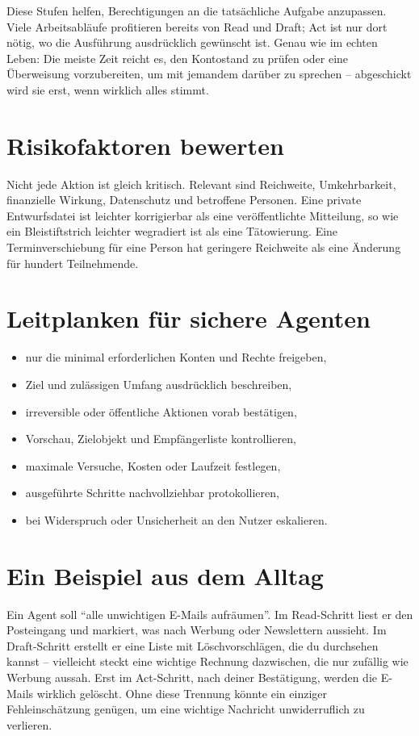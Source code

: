 Diese Stufen helfen, Berechtigungen an die tatsächliche Aufgabe anzupassen. Viele Arbeitsabläufe profitieren bereits von Read und Draft; Act ist nur dort nötig, wo die Ausführung ausdrücklich gewünscht ist. Genau wie im echten Leben: Die meiste Zeit reicht es, den Kontostand zu prüfen oder eine Überweisung vorzubereiten, um mit jemandem darüber zu sprechen -- abgeschickt wird sie erst, wenn wirklich alles stimmt.

\section{Risikofaktoren bewerten}

Nicht jede Aktion ist gleich kritisch. Relevant sind Reichweite, Umkehrbarkeit, finanzielle Wirkung, Datenschutz und betroffene Personen. Eine private Entwurfsdatei ist leichter korrigierbar als eine veröffentlichte Mitteilung, so wie ein Bleistiftstrich leichter wegradiert ist als eine Tätowierung. Eine Terminverschiebung für eine Person hat geringere Reichweite als eine Änderung für hundert Teilnehmende.

\section{Leitplanken für sichere Agenten}

\begin{itemize}
\item nur die minimal erforderlichen Konten und Rechte freigeben,
\item Ziel und zulässigen Umfang ausdrücklich beschreiben,
\item irreversible oder öffentliche Aktionen vorab bestätigen,
\item Vorschau, Zielobjekt und Empfängerliste kontrollieren,
\item maximale Versuche, Kosten oder Laufzeit festlegen,
\item ausgeführte Schritte nachvollziehbar protokollieren,
\item bei Widerspruch oder Unsicherheit an den Nutzer eskalieren.
\end{itemize}

\section{Ein Beispiel aus dem Alltag}

Ein Agent soll ``alle unwichtigen E-Mails aufräumen''. Im Read-Schritt liest er den Posteingang und markiert, was nach Werbung oder Newslettern aussieht. Im Draft-Schritt erstellt er eine Liste mit Löschvorschlägen, die du durchsehen kannst -- vielleicht steckt eine wichtige Rechnung dazwischen, die nur zufällig wie Werbung aussah. Erst im Act-Schritt, nach deiner Bestätigung, werden die E-Mails wirklich gelöscht. Ohne diese Trennung könnte ein einziger Fehleinschätzung genügen, um eine wichtige Nachricht unwiderruflich zu verlieren.

